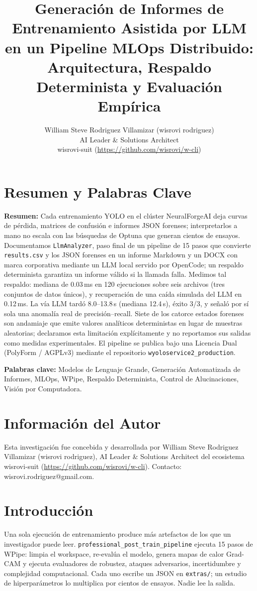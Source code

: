 \documentclass[10pt,twocolumn,letterpaper]{article}
\title{Generación de Informes de Entrenamiento Asistida por LLM en un Pipeline MLOps Distribuido: Arquitectura, Respaldo Determinista y Evaluación Empírica}
\author{William Steve Rodriguez Villamizar (wisrovi rodriguez)\\AI Leader \& Solutions Architect\\wisrovi-suit (\url{https://github.com/wisrovi/w-cli})}
\date{}
\begin{document}
\maketitle

\section{Resumen y Palabras Clave}
\textbf{Resumen:} Cada entrenamiento YOLO en el clúster NeuralForgeAI deja curvas de pérdida, matrices de confusión e informes JSON forenses; interpretarlos a mano no escala con las búsquedas de Optuna que generan cientos de ensayos. Documentamos \texttt{LlmAnalyzer}, paso final de un pipeline de 15 pasos que convierte \texttt{results.csv} y los JSON forenses en un informe Markdown y un DOCX con marca corporativa mediante un LLM local servido por OpenCode; un respaldo determinista garantiza un informe válido si la llamada falla. Medimos tal respaldo: mediana de 0.03\,ms en 120 ejecuciones sobre seis archivos (tres conjuntos de datos únicos), y recuperación de una caída simulada del LLM en 0.12\,ms. La vía LLM tardó 8.0--13.8\,s (mediana 12.4\,s), éxito 3/3, y señaló por sí sola una anomalía real de precisión--recall. Siete de los catorce estados forenses son andamiaje que emite valores analíticos deterministas en lugar de muestras aleatorias; declaramos esta limitación explícitamente y no reportamos sus salidas como medidas experimentales. El pipeline se publica bajo una Licencia Dual (PolyForm / AGPLv3) mediante el repositorio \texttt{wyoloservice2\_production}.

\textbf{Palabras clave:} Modelos de Lenguaje Grande, Generación Automatizada de Informes, MLOps, WPipe, Respaldo Determinista, Control de Alucinaciones, Visión por Computadora.

\section{Información del Autor}
Esta investigación fue concebida y desarrollada por William Steve Rodriguez Villamizar (wisrovi rodriguez), AI Leader \& Solutions Architect del ecosistema wisrovi-suit (\url{https://github.com/wisrovi/w-cli}). Contacto: wisrovi.rodriguez@gmail.com.

\section{Introducción}
Una sola ejecución de entrenamiento produce más artefactos de los que un investigador puede leer. \texttt{professional\_post\_train\_pipeline} ejecuta 15 pasos de WPipe: limpia el workspace, re-evalúa el modelo, genera mapas de calor Grad-CAM y ejecuta evaluadores de robustez, ataques adversarios, incertidumbre y complejidad computacional. Cada uno escribe un JSON en \texttt{extras/}; un estudio de hiperparámetros lo multiplica por cientos de ensayos. Nadie lee la salida.
\end{document}
